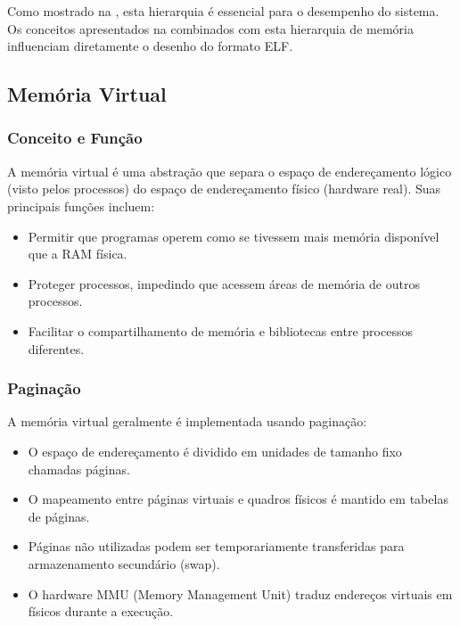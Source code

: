 Como mostrado na , esta hierarquia é essencial para o desempenho do sistema. Os conceitos apresentados na  combinados com esta hierarquia de memória influenciam diretamente o desenho do formato ELF.

\subsection{Memória Virtual}\label{subsec:virtual_memory}

\subsubsection{Conceito e Função}\label{subsubsec:vm_concept}

A memória virtual é uma abstração que separa o espaço de endereçamento lógico (visto pelos processos) do espaço de endereçamento físico (hardware real). Suas principais funções incluem:

\begin{itemize}
    \item Permitir que programas operem como se tivessem mais memória disponível que a RAM física.
    \item Proteger processos, impedindo que acessem áreas de memória de outros processos.
    \item Facilitar o compartilhamento de memória e bibliotecas entre processos diferentes.
\end{itemize}

\subsubsection{Paginação}\label{subsubsec:paging}

A memória virtual geralmente é implementada usando paginação:

\begin{itemize}
    \item O espaço de endereçamento é dividido em unidades de tamanho fixo chamadas páginas.
    \item O mapeamento entre páginas virtuais e quadros físicos é mantido em tabelas de páginas.
    \item Páginas não utilizadas podem ser temporariamente transferidas para armazenamento secundário (swap).
    \item O hardware MMU (Memory Management Unit) traduz endereços virtuais em físicos durante a execução.
\end{itemize}

